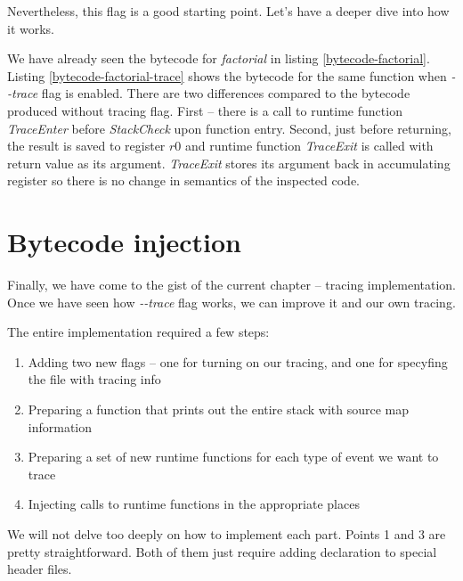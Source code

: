 

Nevertheless, this flag is a good starting point. Let's have a deeper dive into how it works.

We have already seen the bytecode for \emph{factorial} in listing \ref{bytecode-factorial}.
Listing \ref{bytecode-factorial-trace} shows the bytecode for the same function when \emph{-{}-trace}
flag is enabled. There are two differences compared to the bytecode produced without tracing flag.
First -- there is a call to runtime function \emph{TraceEnter} before \emph{StackCheck} upon function entry. 
Second, just before returning, the result is saved to register $r0$ and runtime function \emph{TraceExit} is called
with return value as its argument. \emph{TraceExit} stores its argument back in accumulating register so there
is no change in semantics of the inspected code.




\section{Bytecode injection}
\label{v8-bytecode-injection}

Finally, we have come to the gist of the current chapter -- tracing implementation.
Once we have seen how \emph{-{}-trace} flag works, we can improve it and our own tracing.

The entire implementation required a few steps:
\begin{enumerate}
  \item Adding two new flags -- one for turning on our tracing, and one for specyfing the file with tracing info
  \item Preparing a function that prints out the entire stack with source map information
  \item Preparing a set of new runtime functions for each type of event we want to trace
  \item Injecting calls to runtime functions in the appropriate places
\end{enumerate}

We will not delve too deeply on how to implement each part.
Points 1 and 3 are pretty straightforward. Both of them just require adding declaration to special header files.

